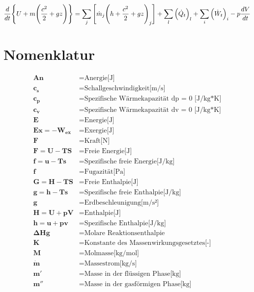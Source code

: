 \documentclass[twocolumn]{article}
\begin{document}
\Large
\begin{equation*}
	\frac{d}{dt}\Bigg{\{} U + m \Bigg{(}\frac{c^2}{2}+gz\Bigg{)}\Bigg{\}} 
	= 
	\sum_{j}{\Bigg{[}\dot{m}_j\Bigg{(}h+\frac{c^2}{2}+gz\Bigg{)}_j \Bigg{]}}  
	+ 
	\sum_{l}^{} \Big(\dot{Q}_t\Big)_l 
	+ 
	\sum_{i}\Big(\dot{W}_t\Big)_i
	-
	p\frac{dV}{dt}
\end{equation*}
\normalsize
\section{Nomenklatur}


\begin{align*}
	\mathbf{An}		&=	\text{Anergie[J]} \\
	\mathbf{c_s}		&=	\text{Schallgeschwindigkeit[m/s]} \\
	\mathbf{c_p}		&=	\text{Spezifische Wärmekapazität dp = 0 [J/kg*K]} \\
	\mathbf{c_v}		&=	\text{Spezifische Wärmekapazität dv = 0 [J/kg*K]} \\
	\mathbf{E}		&=	\text{Energie[J]} \\
	\mathbf{Ex = -W_{ex}}	&=	\text{Exergie[J]} \\
	\mathbf{F}		&=	\text{Kraft[N]} \\
	\mathbf{F = U - TS}	&=	\text{Freie Energie[J]} \\
	\mathbf{f = u-Ts}	&=	\text{Spezifische freie Energie[J/kg]} \\
	\mathbf{f}		&=	\text{Fugazität[Pa]} \\
	\mathbf{G = H -TS}	&=	\text{Freie Enthalpie[J]} \\
	\mathbf{g = h -Ts}	&=	\text{Spezifische freie Enthalpie[J/kg]} \\
	\mathbf{g}		&=	\text{Erdbeschleunigung[m/s²]} \\
	\mathbf{H = U+pV}	&=	\text{Enthalpie[J]} \\
	\mathbf{h = u + pv}	&=	\text{Spezifische Enthalpie[J/kg]} \\
	\mathbf{\Delta Hg}	&=	\text{Molare Reaktionsenthalpie} \\
	\mathbf{K}		&=	\text{Konstante des Massenwirkungsgesetztes[-]} \\
	\mathbf{M}		&=	\text{Molmasse[kg/mol]} \\
	\mathbf{\dot{m}}	&=	\text{Massestrom[kg/s]} \\
	\mathbf{m'}		&=	\text{Masse in der flüssigen Phase[kg]} \\
	\mathbf{m''}		&=	\text{Masse in der gasförmigen Phase[kg]} \\

\end{align*}
\end{document}
